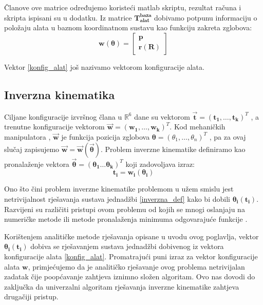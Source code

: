 \documentclass[times, utf8, diplomski, numeric]{fer}
\begin{document}
Članove ove matrice određujemo koristeći matlab skriptu, rezultat računa i skripta ispisani su u dodatku.
Iz matrice $\mathbf{T_{alat}^{baza}}$ dobivamo potpunu informaciju o položaju alata u baznom koordinatnom sustavu kao funkciju zakreta zglobova:
\begin{equation}
\mathbf{w}(\bm \theta) = 
\begin{bmatrix}
\mathbf{p}\\
\mathbf{r}(\mathbf{R})
\end{bmatrix}
\label{konfig_alat}
\end{equation}

Vektor \ref{konfig_alat} još nazivamo vektorom konfiguracije alata.

\subsection{Inverzna kinematika}
Ciljane konfiguracije izvršnog člana u $\mathbb{R}^{6}$ dane su vektorom $\vec{\mathbf{t}} = (\mathbf{t_1}, \ldots , \mathbf{t_k})^{T}$ , a trenutne konfiguracije vektorom
$\vec{\mathbf{w}} = (\mathbf{w_1}, \ldots , \mathbf{w_k})^{T}$. Kod mehaničkih manipulatora , $\vec{\mathbf{w}}$ je funkcija pozicija zglobova ${\bm{\theta}} = (\theta_{1}, \ldots , \theta_{n})^{T}$ , pa za ovaj slučaj zapisujemo $\vec{\mathbf{w}}=\vec{\mathbf{w}}\left({\vec{\bm{\theta}}}\right) $.
Problem inverzne kinematike definiramo kao pronalaženje vektora $\vec{\bm{\theta}} = (\bm{\theta_1} \ldots \bm{\theta_k})^T$ koji zadovoljava izraz:
\begin{equation}
\mathbf{t_i} = \mathbf{w_i}(\bm{\theta}_{\mathbf{i}})
\label{inverzna_def}
\end{equation}

Ono što čini problem inverzne kinematike problemom u užem smislu jest netrivijalnost rješavanja sustava jednadžbi \ref{inverzna_def} kako bi dobili $\bm{\theta}_{\mathbf{i}}(\mathbf{t_i})$. 
Razvijeni su različiti pristupi ovom problemu od kojih se mnogi oslanjaju na numeričke metode ili metode pronalaženja minimuma odgovarajuće funkcije \cite{wang1991combined}.

Korištenjem analitičke metode rješavanja opisane u uvodu ovog poglavlja, vektor $\bm{\theta}_{\mathbf{i}}(\mathbf{t_i})$ dobiva se rješavanjem sustava jednadžbi dobivenog iz vektora konfiguracije alata \ref{konfig_alat}. 
Promatrajući puni izraz za vektor konfiguracije alata $\mathbf{w}$, primjećujemo da je analitičko rješavanje ovog problema netrivijalan zadatak čije poopćavanje zahtjeva iznimno složen algoritam.
Ovo nas dovodi do zaključka da univerzalni algoritam rješavanja inverzne kinematike zahtjeva drugačiji pristup.
\end{document}
